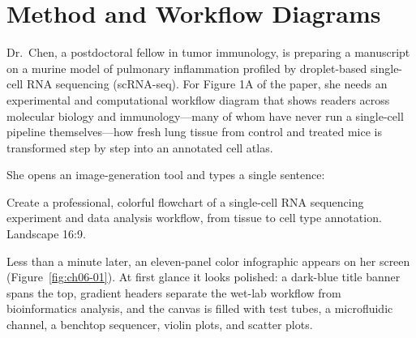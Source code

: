\chapter{Method and Workflow Diagrams}

Dr.\ Chen, a postdoctoral fellow in tumor immunology, is preparing a manuscript on a murine model of pulmonary inflammation profiled by droplet-based single-cell RNA sequencing (scRNA-seq). For Figure 1A of the paper, she needs an experimental and computational workflow diagram that shows readers across molecular biology and immunology—many of whom have never run a single-cell pipeline themselves—how fresh lung tissue from control and treated mice is transformed step by step into an annotated cell atlas.

She opens an image-generation tool and types a single sentence:

\begin{Prompt}
Create a professional, colorful flowchart of a single-cell RNA sequencing experiment and
data analysis workflow, from tissue to cell type annotation. Landscape 16:9.
\end{Prompt}

Less than a minute later, an eleven-panel color infographic appears on her screen (Figure~\ref{fig:ch06-01}). At first glance it looks polished: a dark-blue title banner spans the top, gradient headers separate the wet-lab workflow from bioinformatics analysis, and the canvas is filled with test tubes, a microfluidic channel, a benchtop sequencer, violin plots, and scatter plots.

